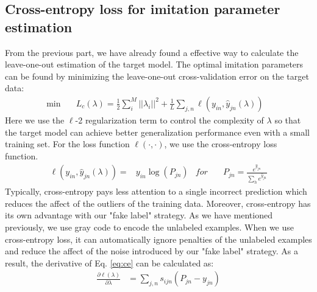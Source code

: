 \subsection{Cross-entropy loss for imitation parameter estimation}
From the previous part, we have already found a effective way to calculate the leave-one-out estimation of the target model. The optimal imitation parameters can be found by minimizing the leave-one-out cross-validation error on the target data:
\begin{equation}\label{eq:loo_loss}
\begin{aligned}
\min \quad& L_c\left(\lambda\right)=\frac{1}{2}\sum_i^M||\lambda_i||^2+\frac{1}{L}\sum_{j,n}\ell\left(y_{in},\hat{y}_{jn}\left(\lambda\right)\right) &
\end{aligned}
\end{equation}
Here we use the $\ell$-2 regularization term to control the complexity of $\lambda$ so that the target model can achieve better generalization performance even with a small training set. For the loss function $\ell(\cdot,\cdot)$, we use the cross-entropy loss function.
\begin{equation}\label{eq:ce}
\begin{aligned}
\ell\left(y_{in},\hat{y}_{jn}\left(\lambda\right)\right)=&y_{in}\log(P_{jn}) & for \quad&
P_{jn} = \frac{e^{\hat{y}_{jn}}}{\sum_{h} e^{\hat{y}_{jh}}}
\end{aligned}
\end{equation}
Typically, cross-entropy pays less attention to a single incorrect prediction which reduces the affect of the outliers of the training data. Moreover, cross-entropy has its own advantage with our "fake label" strategy. As we have mentioned previously, we use gray code to encode the unlabeled examples. When we use cross-entropy loss, it can automatically ignore penalties of the unlabeled examples and reduce the affect of the noise introduced by our "fake label" strategy. 
As a result, the derivative of Eq. \eqref{eq:ce} can be calculated as:
\begin{equation}\label{eq:p}
\begin{aligned}
\frac{\partial \ell(\lambda)}{\partial \lambda}&=\sum_{j,n}s_{ijn}\left(P_{jn}-{y}_{jn}\right)
\end{aligned}
\end{equation}
